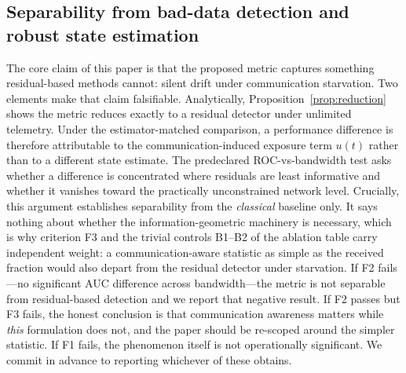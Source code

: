 \documentclass[journal]{IEEEtran}
\theoremstyle{plain}
\theoremstyle{definition}
\theoremstyle{remark}
\begin{document}
\subsection{Separability from bad-data detection and robust state estimation}
The core claim of this paper is that the proposed metric captures
something residual-based methods cannot: silent drift under communication
starvation. Two elements make that claim falsifiable. Analytically,
Proposition~\ref{prop:reduction} shows the metric reduces exactly to a
residual detector under unlimited telemetry. Under the estimator-matched
comparison, a performance difference is therefore attributable to the
communication-induced exposure term $u(t)$ rather than to a different
state estimate. The predeclared ROC-vs-bandwidth test asks
whether a difference is concentrated where residuals are least
informative and whether it vanishes toward the practically unconstrained
network level. Crucially, this argument establishes
separability from the \emph{classical} baseline only. It says nothing
about whether the information-geometric machinery is necessary, which is
why criterion F3 and the trivial controls B1--B2 of
the ablation table carry independent weight: a communication-aware
statistic as simple as the received fraction would also depart from the
residual detector under starvation. If F2 fails---no significant AUC
difference across bandwidth---the metric
is not separable from residual-based detection and we report that negative
result. If F2 passes but F3 fails, the honest conclusion is that
communication awareness matters while \emph{this} formulation does not,
and the paper should be re-scoped around the simpler statistic. If F1
fails, the phenomenon itself is not operationally significant. We commit
in advance to reporting whichever of these obtains.
\end{document}

